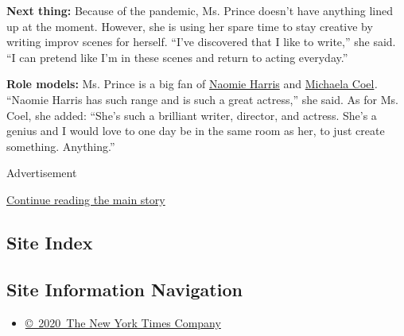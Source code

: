 \textbf{Next thing:} Because of the pandemic, Ms. Prince doesn't have
anything lined up at the moment. However, she is using her spare time to
stay creative by writing improv scenes for herself. ``I've discovered
that I like to write,'' she said. ``I can pretend like I'm in these
scenes and return to acting everyday.''

\textbf{Role models:} Ms. Prince is a big fan of
\href{https://www.nytimes.com/2019/10/25/movies/naomie-harris-black-blue.html}{Naomie
Harris} and
\href{https://www.nytimes.com/2020/07/20/arts/television/i-may-destroy-you-influences.html}{Michaela
Coel}\emph{.} ``Naomie Harris has such range and is such a great
actress,'' she said. As for Ms. Coel, she added: ``She's such a
brilliant writer, director, and actress. She's a genius and I would love
to one day be in the same room as her, to just create something.
Anything.''

Advertisement

\protect\hyperlink{after-bottom}{Continue reading the main story}

\hypertarget{site-index}{%
\subsection{Site Index}\label{site-index}}

\hypertarget{site-information-navigation}{%
\subsection{Site Information
Navigation}\label{site-information-navigation}}

\begin{itemize}
\tightlist
\item
  \href{https://help.nytimes.com/hc/en-us/articles/115014792127-Copyright-notice}{©~2020~The
  New York Times Company}
\end{itemize}


